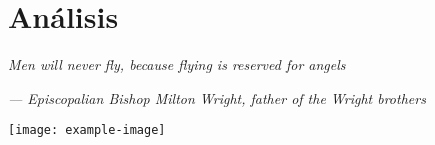 \chapter{Análisis} \label{analisis}
\epigraph{\textit{Men will never fly, because flying is reserved for angels     
	}}{\textit{— Episcopalian Bishop Milton Wright, father of the Wright brothers}}
	\vspace*{8cm}
	\begin{center}
		\centering
		\texttt{[image: example-image]}
	\end{center}
	\thispagestyle{empty}
	\newpage
	\vspace*{2cm}
